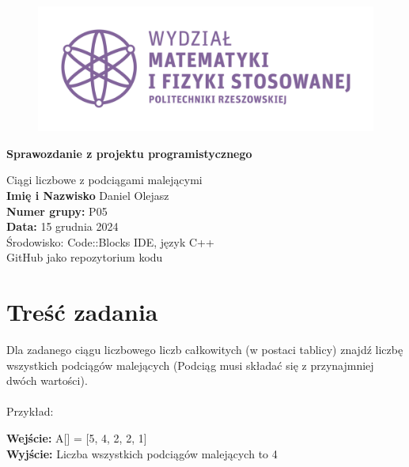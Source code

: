 \documentclass[a4paper,12pt]{article}
\begin{document}
 

\begin{titlepage}
    \centering
    
	\begin{figure}[ht!]
	\centering
	\includegraphics[width=170mm]{wmifs_pl.png}
	\vspace{0.5cm}
	\end{figure}    
    
    {\Huge \textbf{Sprawozdanie z projektu programistycznego}}\\[1cm]
    \rule{0cm}{0.5cm} %
    
    {\LARGE Ciągi liczbowe z podciągami malejącymi}\\[1cm]
    
    \vspace{1cm}
    \large \textbf{Imię i Nazwisko} Daniel Olejasz \\
    \textbf{Numer grupy:} P05\\
    \textbf{Data:} 15 grudnia 2024\\
    
    \vfill
    {\large Środowisko: Code::Blocks IDE, język C++}\\
    \vspace{0.5cm}
    {\large GitHub jako repozytorium kodu}\\
    
    \vfill
\end{titlepage}

\newpage
\tableofcontents
\newpage

\section{Treść zadania}
Dla zadanego ciągu liczbowego liczb całkowitych (w postaci tablicy) znajdź liczbę wszystkich podciągów malejących (Podciąg musi składać się z przynajmniej dwóch wartości). \\ \\
Przykład:
\begin{flushleft}
\textbf{Wejście:} A[] = [5, 4, 2, 2, 1] \\
\textbf{Wyjście:} Liczba wszystkich podciągów malejących to 4 \\
\text{[5, 4], [5, 4, 2], [4, 2], [2, 1]}
\end{flushleft}
\end{document}
